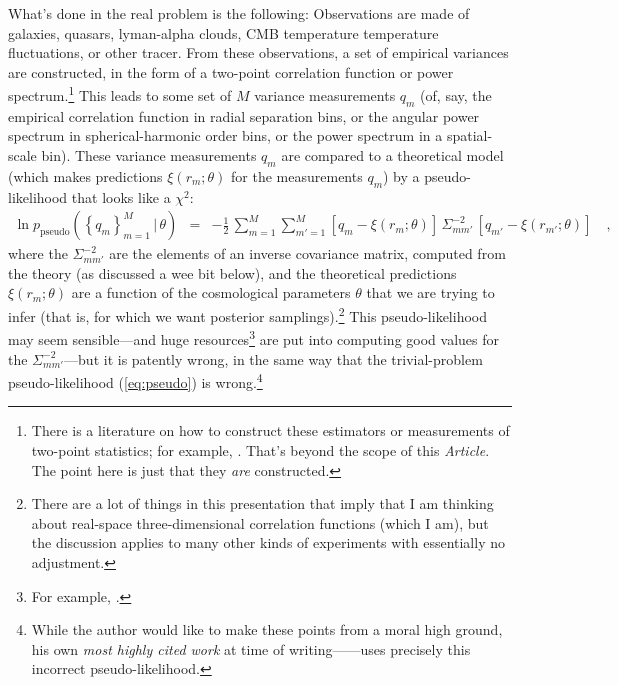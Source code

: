 \documentclass[12pt, letterpaper, preprint]{aastex}
\newcommand{\setof}[1]{\left\{{#1}\right\}}
\newcommand{\given}{\,|\,}
\newcommand{\pseudo}{{\mathrm{pseudo}}}
\newcommand{\documentname}{\textsl{Article}}
\begin{document}
What's done in the real problem is the following:
Observations are made of galaxies, quasars, lyman-alpha clouds, CMB
temperature temperature fluctuations, or other tracer.
From these observations, a set of empirical variances are constructed, in the
form of a two-point correlation function or power
spectrum.\footnote{There is a literature on how to construct
  these estimators or measurements of two-point statistics; for example, \cite{landy}. That's
  beyond the scope of this \documentname. The point here is just that they \emph{are}
  constructed.}
This leads to some set of $M$ variance measurements $q_m$ (of, say, the
empirical correlation function in radial separation bins, or the
angular power spectrum in spherical-harmonic order bins, or the power
spectrum in a spatial-scale bin).
These variance measurements $q_m$ are compared to a theoretical model (which makes
predictions $\xi(r_m;\theta)$ for the measurements $q_m$) by a
pseudo-likelihood that looks like a $\chi^2$:
\begin{eqnarray}
\ln p_\pseudo(\setof{q_m}_{m=1}^M\given\theta) &=&
 -\frac{1}{2}\,\sum_{m=1}^M\sum_{m'=1}^M [q_m - \xi(r_m;\theta)]\,\Sigma^{-2}_{mm'}\,[q_{m'} - \xi(r_{m'};\theta)]
\label{eq:pseudoreal}\quad ,
\end{eqnarray}
where the $\Sigma^{-2}_{mm'}$ are the elements of an inverse
covariance matrix, computed from the theory (as discussed a wee bit
below), and the theoretical predictions $\xi(r_m;\theta)$ are a
function of the cosmological parameters $\theta$ that we are trying to
infer (that is, for which we want posterior samplings).\footnote{There
  are a lot of things in this presentation that imply that I am
  thinking about real-space three-dimensional correlation functions
  (which I am), but the discussion applies to many other kinds of
  experiments with essentially no adjustment.}
This pseudo-likelihood may seem sensible---and huge resources\footnote{For
  example, \cite{percival}.} are put
into computing good values for the $\Sigma^{-2}_{mm'}$---but it is patently wrong, in the same
way that the trivial-problem pseudo-likelihood (\ref{eq:pseudo}) is
wrong.\footnote{While the author would like to make these points from
  a moral high ground, his own \emph{most highly cited work} at time of
  writing---\cite{eisenstein}---uses precisely this incorrect pseudo-likelihood.}
\end{document}
